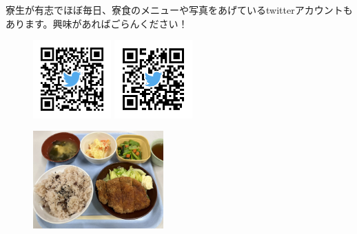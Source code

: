   


寮生が有志でほぼ毎日、寮食のメニューや写真をあげているtwitterアカウントもあります。興味があればごらんください！

\begin{figure}[h]
  \begin{minipage}[b]{0.5\textwidth}
    \centering
    \includegraphics[width=3cm]{gazo/QR_ryoshoku_bot.png}
  \end{minipage}
  \begin{minipage}[b]{0.5\textwidth}
    \centering
    \includegraphics[width=3cm]{gazo/QR_ajiri.png}
  \end{minipage}
\end{figure}


\begin{figure}[H]
  \centering
  \includegraphics[width=5cm]{gazo/sekihan.jpg}
\end{figure}